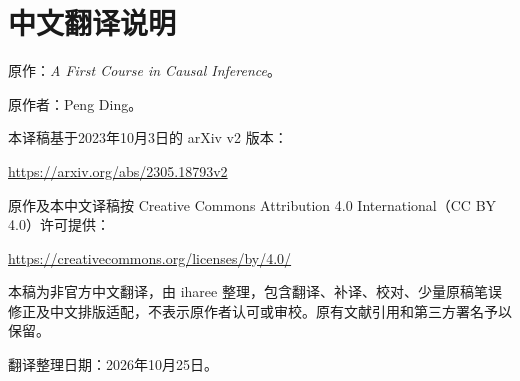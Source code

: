 \chapter*{中文翻译说明}
\thispagestyle{empty}

原作：\emph{A First Course in Causal Inference}。

原作者：Peng Ding。

本译稿基于2023年10月3日的 arXiv v2 版本：
\begin{center}
\url{https://arxiv.org/abs/2305.18793v2}
\end{center}

原作及本中文译稿按 Creative Commons Attribution 4.0 International（CC BY 4.0）许可提供：
\begin{center}
\url{https://creativecommons.org/licenses/by/4.0/}
\end{center}

本稿为非官方中文翻译，由 iharee 整理，包含翻译、补译、校对、少量原稿笔误修正及中文排版适配，不表示原作者认可或审校。原有文献引用和第三方署名予以保留。

翻译整理日期：2026年10月25日。
